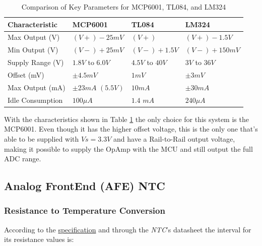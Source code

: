 \documentclass[12pt]{article}
\begin{document}
    \begin{table}[h]
        \centering
        \caption{Comparison of Key Parameters for MCP6001, TL084, and LM324}
        \begin{tabularx}{\textwidth}{>{\centering\arraybackslash}X >{\centering\arraybackslash}X >{\centering\arraybackslash}X >{\centering\arraybackslash}X}
            \toprule
            \textbf{Characteristic} & \textbf{MCP6001} & \textbf{TL084} & \textbf{LM324} \\
            \midrule
            Max Output (V) & $(V+)-25mV$ & $(V+)$ & $(V+) - 1.5V$ \\
            \midrule
            Min Output (V) & $(V-)+25mV$ & $(V-) + 1.5V$ & $(V-) + 150mV$ \\
            \midrule
            Supply Range (V) & $1.8V$ to $6.0V$ & $4.5V$ to $40V$ & $3V$ to $36V$ \\
            \midrule
            Offset (mV) & $\pm 4.5mV$ & $1mV$ & $\pm 3 mV$ \\
            \midrule
            Max Output (mA) & $\pm 23 mA$ $(5.5V)$ & $10 mA$ & $\pm 30 mA$ \\
            \midrule
            Idle Consumption & $100 \mu A $ & $1.4$ $mA$ & $240 \mu A$ \\
            \bottomrule
        \end{tabularx}
        \label{tab:opamp}
    \end{table}

    With the characteristics shown in Table \ref{tab:opamp} the only choice for this system is the MCP6001. Even though it has the higher offset voltage, this is the only one that's able to be supplied with $Vs=3.3V$ and have a Rail-to-Rail output voltage, making it possible to supply the OpAmp with the MCU and still output the full ADC range.


\subsection{Analog FrontEnd (AFE) NTC}

    \subsubsection{ Resistance to Temperature Conversion }

    According to the \hyperref[requirements]{specification} and through the \textit{NTC}'s datasheet \cite{NTC_datasheet} the interval for its resistance values is:
    
\end{document}
